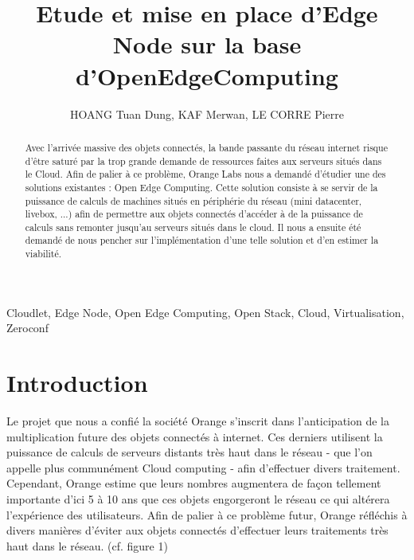 \documentclass[twocolumn,a4paper]{IEEEtranfr}
\begin{document}
\title{Etude et mise en place d'Edge Node sur la base d'OpenEdgeComputing}
\author{HOANG Tuan Dung, KAF Merwan, LE CORRE Pierre} 

\maketitle

\begin{abstract}
Avec l’arrivée massive des objets connectés, la bande passante du réseau internet risque d'être saturé par la trop grande demande de ressources faites aux serveurs situés dans le Cloud. Afin de palier à ce problème, Orange Labs nous a demandé d'étudier une des solutions existantes : Open Edge Computing. Cette solution consiste à se servir de la puissance de calculs de machines situés en périphérie du réseau (mini datacenter, livebox, ...) afin de permettre aux objets connectés d'accéder à de la puissance de calculs sans remonter jusqu'au serveurs situés dans le cloud. Il nous a ensuite été demandé de nous pencher sur l'implémentation d'une telle solution et d'en estimer la viabilité. 

\end{abstract} 

\begin{keywords}
Cloudlet, Edge Node, Open Edge Computing, Open Stack, Cloud, Virtualisation, Zeroconf
\end{keywords}



\section{Introduction}

Le projet que nous a confié la société Orange s’inscrit dans l’anticipation de la multiplication future des objets connectés à internet. Ces derniers utilisent la puissance de calculs de serveurs distants très haut dans le réseau - que l’on appelle plus communément Cloud computing - afin d’effectuer divers traitement. Cependant, Orange estime que leurs nombres augmentera de façon tellement importante d’ici 5 à 10 ans que ces objets engorgeront le réseau ce qui altérera l’expérience des utilisateurs. Afin de palier à ce problème futur, Orange réfléchis à divers manières d’éviter aux objets connectés d’effectuer leurs traitements très haut dans le réseau.  (cf. figure 1)
\end{document}
